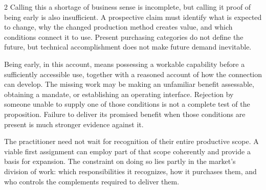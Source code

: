 \begin{multicols}{2}
Calling this a shortage of business sense is incomplete, but calling it
proof of being early is also insufficient. A prospective claim must
identify what is expected to change, why the changed production method
creates value, and which conditions connect it to use. Present
purchasing categories do not define the future, but technical
accomplishment does not make future demand inevitable.

Being early, in this account, means possessing a workable capability
before a sufficiently accessible use, together with a reasoned account
of how the connection can develop. The missing work may be making an
unfamiliar benefit assessable, obtaining a mandate, or establishing an
operating interface. Rejection by someone unable to supply one of those
conditions is not a complete test of the proposition. Failure to deliver
its promised benefit when those conditions are present is much stronger
evidence against it.

The practitioner need not wait for recognition of their entire
productive scope. A viable first assignment can employ part of that
scope coherently and provide a basis for expansion. The constraint on
doing so lies partly in the market's division of work: which
responsibilities it recognizes, how it purchases them, and who controls
the complements required to deliver them.

\FragmentedAssignmentArt

\end{multicols}

